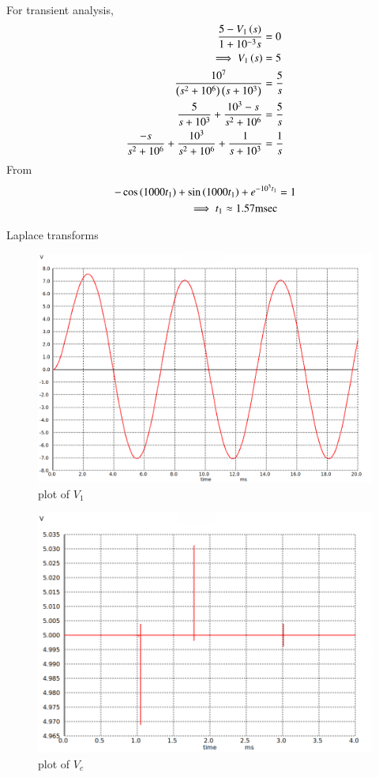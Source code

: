 \documentclass[journal,12pt,twocolumn]{IEEEtran}
\begin{document}
For transient analysis,
\begin{align}
    \frac{5-V_1\left(s\right)}{1+10^{-3}s} &= 0\\
    \implies V_1\left(s\right) &= 5\\
    \frac{10^7}{\left(s^2+10^6\right)\left(s+10^3\right)} &= \frac{5}{s}\\
    \frac{5}{s+10^3} + \frac{10^3-s}{s^2 + 10^6} &= \frac{5}{s}\\
    \frac{-s}{s^2+10^6} + \frac{10^3}{s^2 + 10^6} + \frac{1}{s+10^3} &= \frac{1}{s}
\end{align}
From 
\begin{align}
    -\cos\left(1000t_1\right)+\sin\left(1000t_1\right)+e^{-10^3 t_1} &= 1\\
    \implies t_1 \approx 1.57\text{msec}
\end{align}



\begin{table}[ht]
    
    \vspace{0.5cm}
    \caption{Laplace transforms}
    \label{tab:Gate.ee.54.1}
\end{table}

\begin{figure}[ht]
    \centering
    \includegraphics[width=1\columnwidth]{figs/fig1.png}
    \caption{plot of $V_1$}
    \label{fig:fig1.gate.ee.23.54}
\end{figure}

\begin{figure}[ht]
    \centering
    \includegraphics[width=1\columnwidth]{figs/fig2.png}
    \caption{plot of $V_c$}
    \label{fig:fig2.gate.ee.23.54}
\end{figure}
\end{document}
